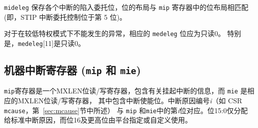 \iffalse
{\tt mideleg} holds trap delegation bits for individual interrupts, with the
layout of bits matching those in the {\tt mip} register (i.e., STIP interrupt
delegation control is located in bit 5).

For exceptions that cannot occur in less privileged modes, the corresponding
{\tt medeleg} bits should be read-only zero.  In particular,
{\tt medeleg}[11] is read-only zero.
\fi

{\tt mideleg} 保存各个中断的陷入委托位，位的布局与 {\tt mip} 寄存器中的位布局相匹配(即，STIP 中断委托控制位于第 5 位)。

对于在较低特权模式下不能发生的异常，相应的 {\tt medeleg} 位应为只读0。 特别是，{\tt medeleg}[11]是只读0。

\subsection{机器中断寄存器 ({\tt mip} 和 {\tt mie})}

\iffalse
The {\tt mip} register is an MXLEN-bit read/write register containing
information on pending interrupts, while {\tt mie} is the
corresponding MXLEN-bit read/write register containing interrupt enable
bits.
Interrupt cause number \textit{i} (as reported in CSR {\tt mcause},
Section~\ref{sec:mcause}) corresponds with bit~\textit{i} in both
{\tt mip} and {\tt mie}.
Bits 15:0 are allocated to standard interrupt causes only, while bits 16
and above are designated for platform or custom use.
\fi

{\tt mip}寄存器是一个MXLEN位读/写寄存器，包含有关挂起中断的信息，而 {\tt mie} 是相应的MXLEN位读/写寄存器，
其中包含中断使能位。中断原因编号\textit{i}（如 CSR {\tt mcause}，第~\ref{sec:mcause}节中所述）
与 {\tt mip} 和{\tt mie}中的第\textit{i}位对应。位15:0仅分配给标准中断原因，而位16及更高位由平台指定或自定义使用。


